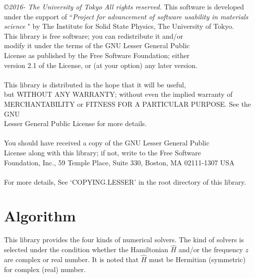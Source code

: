 \documentclass[12pt,titlepage]{article}
\begin{document}
\noindent
{\it \copyright 2016- The University of Tokyo} {\it  All rights reserved.}
This software is developed under the support of ``{\it Project for advancement of software usability in materials science }" by The Institute for Solid State Physics, The University of Tokyo. 
 \\
This library is free software; you can redistribute it and/or \\
modify it under the terms of the GNU Lesser General Public \\
License as published by the Free Software Foundation; either \\
version 2.1 of the License, or (at your option) any later version. \\
 \\
This library is distributed in the hope that it will be useful, \\
but WITHOUT ANY WARRANTY; without even the implied warranty of \\
MERCHANTABILITY or FITNESS FOR A PARTICULAR PURPOSE.  See the GNU \\
Lesser General Public License for more details. \\
 \\
You should have received a copy of the GNU Lesser General Public \\
License along with this library; if not, write to the Free Software \\
Foundation, Inc., 59 Temple Place, Suite 330, Boston, MA  02111-1307  USA \\
 \\
For more details, See `COPYING.LESSER' in the root directory of this library.

\section{Algorithm}

This library provides the four kinds of numerical solvers.
The kind of solvers is selected under the condition whether the Hamiltonian ${\hat H}$ and/or the frequency $z$ are complex or real number. It is noted that ${\hat H}$ must be Hermitian (symmetric) for complex (real) number.  
\end{document}
